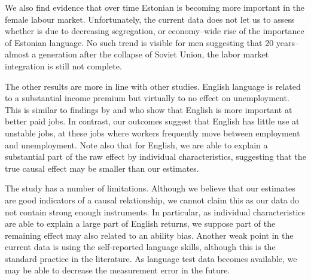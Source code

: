\documentclass[12pt, a4paper]{article}
\begin{document}
We also find evidence that over time Estonian is becoming more
important in the female labour market.  Unfortunately, the current data
does not let us to assess whether is due to decreasing segregation, or
economy--wide rise of the importance of Estonian language.  No such trend is visible for
men suggesting that 20 years--almost a generation after the collapse of Soviet Union, the
labor market integration is still not complete.

The other results are more in line with other studies.
English language is related to a substantial income premium but
virtually to no effect on unemployment.  This is similar to findings by
\citet{ginsburgh+prieto-rodriguez2011ILRR} and
\citet{beblavy+2016CEPS} who show that English is more important at better paid
jobs.  In contrast, our outcomes suggest that English has little use
at unstable jobs, at these jobs where workers frequently move between
employment and unemployment.
Note also that for
English, we are able to explain a substantial part of the raw effect
by individual characteristics, suggesting that the true causal effect
may be smaller than our estimates.

The study has a number of limitations.  Although we believe that our
estimates are good indicators of a causal relationship, we cannot 
claim this as our data do not contain strong enough instruments.
In particular, as individual characteristics are able to explain a
large part of English returns, we suppose part of the remaining effect
may also related to an ability bias.  Another weak point in the current
data is using the self-reported language
skills, although this is the standard practice in the literature.  As language test data becomes available, we may be able to
decrease the measurement error in the future.




\clearpage
\appendix


\listoffixmes
\end{document}
